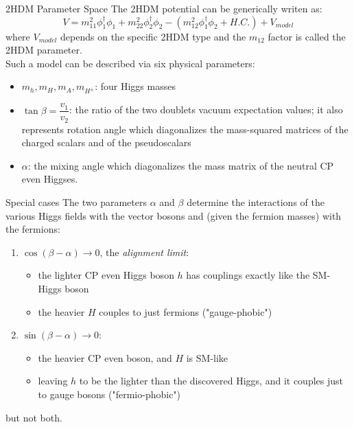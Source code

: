 \documentclass[10pt]{beamer} %
\begin{document}
\begin{frame}{2HDM Parameter Space}
The 2HDM potential can be generically writen as:
    \begin{equation*}
        V = m_{11}^2 \phi_1^\dagger \phi_1 + m_{22}^2 \phi_2^\dagger \phi_2 - (m_{12}^2 \phi^\dagger_1 \phi_2 + H.C.) + V_{model}
    \end{equation*}
    where $V_{model}$ depends on the specific 2HDM type and the $m_{12}$ factor is called the 2HDM parameter.\\
Such a model can be described via six physical parameters: 
\begin{itemize}
    \item $m_{h},m_{H},m_{A},m_{{H^{\pm }}}$: four Higgs masses
    \item $\tan \beta = \dfrac{v_1}{v_2}$: the ratio of the two doublets vacuum expectation values; it also represents rotation angle which diagonalizes the mass-squared matrices of the charged scalars and of the pseudoscalars
    \item $\alpha $: the mixing angle which diagonalizes the mass matrix of the neutral CP even Higgses.
\end{itemize}
\end{frame}



\begin{frame}{Special cases}
The two parameters $\alpha$ and $\beta$ determine the interactions of the various Higgs fields with the
vector bosons and (given the fermion masses) with the fermions:
\begin{enumerate}
    \item $ \cos(\beta -\alpha )\rightarrow 0$, the \emph{alignment limit}:
     \begin{itemize}
         \item the lighter CP even Higgs boson $h$ has couplings exactly like the SM-Higgs boson
         \item the heavier $H$ couples to just fermions ("gauge-phobic")
     \end{itemize}
    \item $ \sin(\beta -\alpha )\rightarrow 0$:
    \begin{itemize}
        \item the heavier CP even boson, and $H$ is SM-like
        \item leaving $h$ to be the lighter than the discovered Higgs, and it couples just to gauge bosons ("fermio-phobic")
    \end{itemize}
\end{enumerate}
but not both.
        
\end{frame}
\end{document}
